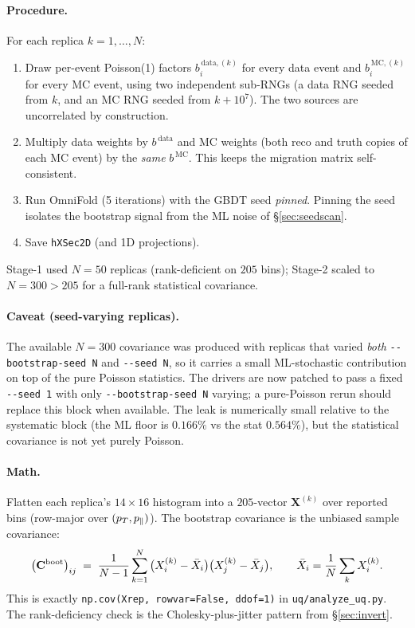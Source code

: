 \paragraph{Procedure.}
For each replica $k=1,\dots,N$:
\begin{enumerate}[nosep]
  \item Draw per-event Poisson(1) factors $b_{i}^{\,\text{data},(k)}$
        for every data event and $b_{i}^{\,\text{MC},(k)}$ for every
        MC event, using two independent sub-RNGs (a data RNG seeded
        from $k$, and an MC RNG seeded from $k + 10^{7}$). The two
        sources are uncorrelated by construction.
  \item Multiply data weights by $b^{\,\text{data}}$ and MC weights
        (both reco and truth copies of each MC event) by the
        \emph{same} $b^{\,\text{MC}}$. This keeps the migration
        matrix self-consistent.
  \item Run OmniFold (5 iterations) with the GBDT seed \emph{pinned}.
        Pinning the seed isolates the bootstrap signal from the ML
        noise of \S\ref{sec:seedscan}.
  \item Save \texttt{hXSec2D} (and 1D projections).
\end{enumerate}
Stage-1 used $N=50$ replicas (rank-deficient on $205$ bins); Stage-2
scaled to $N=300 > 205$ for a full-rank statistical covariance.

\paragraph{Caveat (seed-varying replicas).}
The available $N=300$ covariance was produced with replicas that
varied \emph{both} \texttt{-{}-bootstrap-seed N} and \texttt{-{}-seed N},
so it carries a small ML-stochastic contribution on top of the pure
Poisson statistics. The drivers are now patched to pass a fixed
\texttt{-{}-seed 1} with only \texttt{-{}-bootstrap-seed N} varying;
a pure-Poisson rerun should replace this block when available. The
leak is numerically small relative to the systematic block (the ML
floor is $0.166\%$ vs the stat $0.564\%$), but the statistical
covariance is not yet purely Poisson.

\paragraph{Math.}
Flatten each replica's $14\times16$ histogram into a $205$-vector
$\mathbf{X}^{(k)}$ over reported bins (row-major over $(p_{T},p_{\parallel})$).
The bootstrap covariance is the unbiased sample covariance:
\begin{equation}
\big(\mathbf{C}^{\text{boot}}\big)_{ij}
\;=\;
\frac{1}{N-1}\sum_{k=1}^{N}
\big(X_{i}^{(k)} - \bar X_{i}\big)\big(X_{j}^{(k)} - \bar X_{j}\big),
\qquad
\bar X_{i} = \frac{1}{N}\sum_{k} X_{i}^{(k)}.
\label{eq:bootcov}
\end{equation}
This is exactly \texttt{np.cov(Xrep, rowvar=False, ddof=1)} in
\texttt{uq/analyze\_uq.py}. The rank-deficiency check is the
Cholesky-plus-jitter pattern from \S\ref{sec:invert}.

